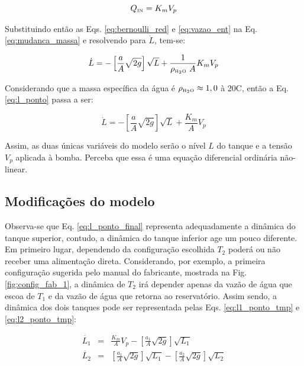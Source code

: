 \begin{equation}\label{eq:vazao_ent}
Q_{\text{\tiny IN}} = K_mV_p
\end{equation}

Substituindo então as Eqs. \ref{eq:bernoulli_red} e \ref{eq:vazao_ent} na Eq.
\ref{eq:mudanca_massa} e resolvendo para $\dot{L}$, tem-se:

\begin{equation}\label{eq:l_ponto}
\dot{L} = -\left[\frac{a}{A}\sqrt{2g}\right]\sqrt{L} + 
          \frac{1}{\rho_{\tiny \text{\tiny H}_2\text{\tiny O}}\ A}K_mV_p
\end{equation}

Considerando que a massa específica da água é $\rho_{\tiny \text{\tiny H}_2\text{\tiny O}} \approx 1,0$ à
20\textdegree C, então a Eq. \ref{eq:l_ponto} passa a ser:

\begin{equation}\label{eq:l_ponto_final}
\dot{L} = -\left[\frac{a}{A}\sqrt{2g}\right]\sqrt{L} + 
          \frac{K_m}{A}V_p
\end{equation}

Assim, as duas únicas variáveis do modelo serão o nível $L$ do tanque e a tensão
$V_p$ aplicada à bomba. Perceba que essa é uma equação diferencial ordinária
não-linear.

\subsection{Modificações do modelo}
Observa-se que Eq. \ref{eq:l_ponto_final} representa adequadamente a dinâmica do
tanque superior, contudo, a dinâmica do tanque inferior age um pouco diferente.
Em primeiro lugar, dependendo da configuração escolhida $T_2$ poderá ou não
receber uma alimentação direta. Considerando, por exemplo, a primeira
configuração sugerida pelo manual do fabricante, mostrada na Fig.
\ref{fig:config_fab_1}, a dinâmica de $T_2$ irá depender apenas da vazão de água
que escoa de $T_1$ e da vazão de água que retorna ao reservatório. Assim sendo,
a dinâmica dos dois tanques pode ser representada pelas Eqs.
\ref{eq:l1_ponto_tmp} e \ref{eq:l2_ponto_tmp}:

\begin{eqnarray}
\dot{L_1} & = & \frac{K_m}{A}V_p -
                \left[\frac{a_1}{A}\sqrt{2g}\right]\sqrt{L_1}
                \label{eq:l1_ponto_tmp}\\
\dot{L_2} & = & \left[\frac{a_1}{A}\sqrt{2g}\right]\sqrt{L_1} -
                \left[\frac{a_2}{A}\sqrt{2g}\right]\sqrt{L_2}
                \label{eq:l2_ponto_tmp}
\end{eqnarray}

